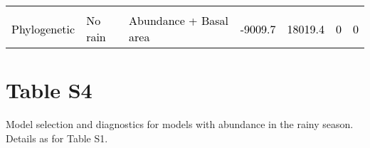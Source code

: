 \documentclass[
  12pt,
  letterpaper,
  DIV=11,
  numbers=noendperiod]{scrartcl}
\begin{document}
\begin{table}[H]
{\begin{tabular}[t]{lllllll}
\cellcolor{gray!6}{\textcolor{black}{Non-phylogenetic}} & \cellcolor{gray!6}{\textcolor{black}{No rain}} & \cellcolor{gray!6}{\textcolor{black}{Abundance + Basal area}} & \cellcolor{gray!6}{\textcolor{black}{-9009.5}} & \cellcolor{gray!6}{\textcolor{black}{18019.0}} & \cellcolor{gray!6}{\textcolor{black}{0}} & \cellcolor{gray!6}{\textcolor{black}{0}}\\
\textcolor{black}{Phylogenetic} & \textcolor{black}{No rain} & \textcolor{black}{Abundance + Basal area} & \textcolor{black}{-9009.7} & \textcolor{black}{18019.4} & \textcolor{black}{0} & \textcolor{black}{0}\\
\bottomrule
\end{tabular}}
\end{table}

\newpage

\hypertarget{table-s4}{%
\section{Table S4}\label{table-s4}}

Model selection and diagnostics for models with abundance in the rainy
season. Details as for Table S1.
\end{document}
